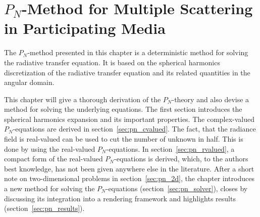 \chapter{$P_N$-Method for Multiple Scattering in Participating Media}
%
\label{sec:pnmethod}

The $P_N$-method presented in this chapter is a deterministic method for solving the radiative transfer equation. It is based on the spherical harmonics discretization of the radiative transfer equation and its related quantities in the angular domain. 

This chapter will give a thorough derivation of the $P_N$-theory and also devise a method for solving the underlying equations. The first section introduces the spherical harmonics expansion and its important properties. The complex-valued $P_N$-equations are derived in section~\ref{sec:pn_cvalued}. The fact, that the radiance field is real-valued can be used to cut the number of unknown in half. This is done by using the real-valued $P_N$-equations. In section~\ref{sec:pn_rvalued}, a compact form of the real-valued $P_N$-equations is derived, which, to the authors best knowledge, has not been given anywhere else in the literature. After a short note on two-dimensional problems in section~\ref{sec:pn_2d}, the chapter introduces a new method for solving the $P_N$-equations (section~\ref{sec:pn_solver}), closes by discussing its integration into a rendering framework and highlights results (section~\ref{sec:pn_results}).








